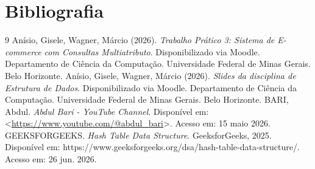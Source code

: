 \documentclass[11pt,a4paper]{article}
\begin{document}
\section{Bibliografia}
\begin{thebibliography}{9}
Anísio, Gisele, Wagner, Márcio (2026). \textit{Trabalho Prático 3: Sistema de E-commerce com Consultas Multiatributo}. Disponibilizado via Moodle. Departamento de Ciência da Computação. Universidade Federal de Minas Gerais. Belo Horizonte.
Anísio, Gisele, Wagner, Márcio (2026). \textit{Slides da disciplina de Estrutura de Dados}. Disponibilizado via Moodle. Departamento de Ciência da Computação. Universidade Federal de Minas Gerais. Belo Horizonte.
BARI, Abdul. \textit{Abdul Bari - YouTube Channel}. Disponível em: <\url{https://www.youtube.com/@abdul_bari}>. Acesso em: 15 maio 2026.
GEEKSFORGEEKS. \textit{Hash Table Data Structure}. GeeksforGeeks, 2025. 
Disponível em: https://www.geeksforgeeks.org/dsa/hash-table-data-structure/. 
Acesso em: 26 jun. 2026.
\end{thebibliography}
\end{document}
